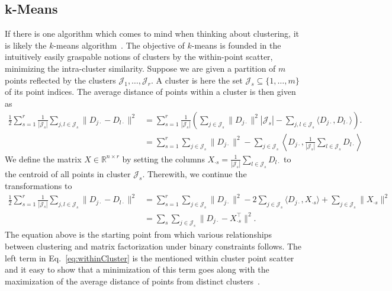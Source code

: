 \subsection{k-Means}\label{sec:ZS:kmeans}
If there is one algorithm which comes to mind when thinking about clustering, it is likely the $k$-means algorithm~\citep{lloyd1982least}. The objective of $k$-means is founded in the intuitively easily graspable notions of clusters by the within-point scatter, minimizing the intra-cluster similarity.
Suppose we are given a partition of $m$ points reflected by the clusters $\mathcal{J}_1,\ldots, \mathcal{J}_r$. A cluster is here the set $\mathcal{J}_s\subseteq \{1,\ldots, m\}$ of its point indices. The average distance of points within a cluster is then given as
\begin{align*}
\frac{1}{2}\sum_{s=1}^r\frac{1}{|\mathcal{J}_s|}\sum_{j,l\in \mathcal{J}_s} \|D_{j\cdot}-D_{l\cdot}\|^2 
&= \sum_{s=1}^r \frac{1}{|\mathcal{J}_s|}\left(\sum_{j\in \mathcal{J}_s} \|D_{j\cdot}\|^2|\mathcal{J}_s| - \sum_{j,l\in \mathcal{J}_s}\langle D_{j\cdot},D_{l\cdot}\rangle\right).\\
&= \sum_{s=1}^r \sum_{j\in \mathcal{J}_s} \|D_{j\cdot }\|^2 -\sum_{j\in \mathcal{J}_s}\left\langle D_{j\cdot},\frac{1}{|\mathcal{J}_s|}\sum_{l\in\mathcal{J}_s}D_{l\cdot}\right\rangle
\end{align*}
We define the matrix $X\in\mathbb{R}^{n\times r}$ by setting the columns $X_{\cdot s}=\frac{1}{|\mathcal{J}_s|}\sum_{l\in\mathcal{J}_s}D_{l\cdot}$ to the centroid of all points in cluster $\mathcal{J}_s$. Therewith, we continue the transformations to
\begin{align}
\frac{1}{2}\sum_{s=1}^r\frac{1}{|\mathcal{J}_s|}\sum_{j,l\in \mathcal{J}_s} \|D_{j\cdot}-D_{l\cdot}\|^2 
&= \sum_{s=1}^r \sum_{j\in \mathcal{J}_s} \|D_{j\cdot }\|^2 -2\sum_{j\in \mathcal{J}_s}\langle D_{j\cdot},X_{\cdot s}\rangle +\sum_{j\in \mathcal{J}_s}\|X_{\cdot s}\|^2 \label{eq:withinCluster}\\
&= \sum_s \sum_{j\in \mathcal{J}_s} \|D_{j\cdot} -X_{\cdot s}^\top\|^2.\nonumber
\end{align}
The equation above is the starting point from which various relationships between clustering and matrix factorization under binary constraints follows. The left term in Eq.~\eqref{eq:withinCluster} is the mentioned within cluster point scatter and it easy to show that a minimization of this term goes along with the maximization of the average distance of points from distinct clusters~\citep{friedman2001elements}. 

